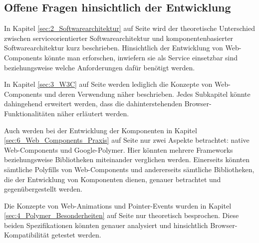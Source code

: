 \subsection{Offene Fragen hinsichtlich der Entwicklung}
\label{sec:7_Fragen}

In Kapitel \ref{sec:2_Softwarearchitektur} auf Seite \pageref{sec:2_Softwarearchitektur} wird der theoretische Unterschied zwischen serviceorientierter Softwarearchitektur und komponentenbasierter Softwarearchitektur kurz beschrieben. Hinsichtlich der Entwicklung von Web-Components könnte man erforschen, inwiefern sie als Service einsetzbar sind beziehungsweise welche Anforderungen dafür benötigt werden.

In Kapitel \ref{sec:3_W3C} auf Seite \pageref{sec:3_W3C} werden lediglich die Konzepte von Web-Components und deren Verwendung näher beschrieben. Jedes Subkapitel könnte dahingehend erweitert werden, dass die dahinterstehenden Browser-Funktionalitäten näher erläutert werden.

Auch werden bei der Entwicklung der Komponenten in Kapitel \ref{sec:6_Web_Components_Praxis} auf Seite \pageref{sec:6_Web_Components_Praxis} nur zwei Aspekte betrachtet: native Web-Components und Google-Polymer. Hier könnten mehrere Frameworks beziehungsweise Bibliotheken miteinander verglichen werden. Einerseits könnten sämtliche Polyfills von Web-Components und andererseits sämtliche Bibliotheken, die der Entwicklung von Komponenten dienen, genauer betrachtet und gegenübergestellt werden.

Die Konzepte von Web-Animations und Pointer-Events wurden in Kapitel \ref{sec:4_Polymer_Besonderheiten} auf Seite \pageref{sec:4_Polymer_Besonderheiten} nur theoretisch besprochen. Diese beiden Spezifikationen könnten genauer analysiert und hinsichtlich Browser-Kompatibilität getestet werden.